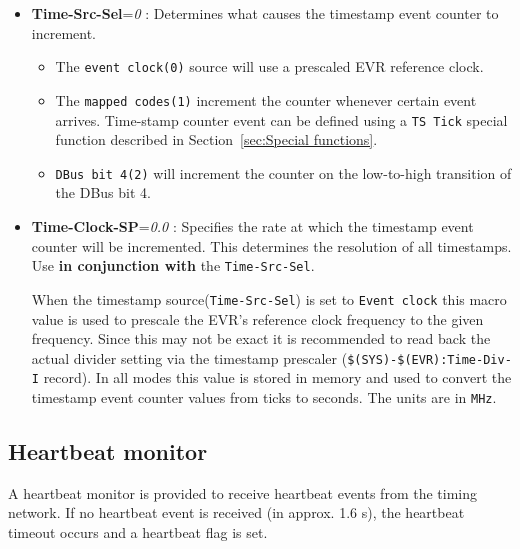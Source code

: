 \documentclass[12pt,a4paper]{article}
\begin{document}
\begin{itemize}
\item
	\textbf{Time-Src-Sel}=\emph{0} : Determines what causes the
timestamp event counter to increment.

\begin{itemize}
\item
  The \texttt{event clock(0)} source will use a prescaled EVR
  reference clock.
\item
  The \texttt{mapped codes(1)} increment the counter whenever
  certain event arrives. Time-stamp counter event can be defined using a \texttt{TS Tick} special function described in Section~\ref{sec:Special functions}.
\item
  \texttt{DBus bit 4(2)} will increment the counter on the
  low-to-high transition of the DBus bit 4.
\end{itemize}
\item
	\textbf{Time-Clock-SP}=\emph{0.0} : Specifies the rate at which the
timestamp event counter will be incremented. This determines the
resolution of all timestamps. Use \textbf{in conjunction with} the \texttt{Time-Src-Sel}.

When the timestamp source(\texttt{Time-Src-Sel}) is set to \texttt{Event clock}
this macro value is used to prescale the EVR's reference clock
frequency to the given frequency. Since this may not be exact it is
recommended to read back the actual divider setting via the
timestamp prescaler (\texttt{\$(SYS)-\$(EVR):Time-Div-I} record). In
all modes this value is stored in memory and used to convert the
timestamp event counter values from ticks to seconds. The units are
in \texttt{MHz}.
\end{itemize}

\subsection{Heartbeat monitor}\label{sec:Heartbeat monitor}
A heartbeat monitor is provided to receive heartbeat events from the timing network. If no heartbeat event is received (in approx. 1.6 s), the heartbeat timeout occurs and a heartbeat flag is set. 
\end{document}
